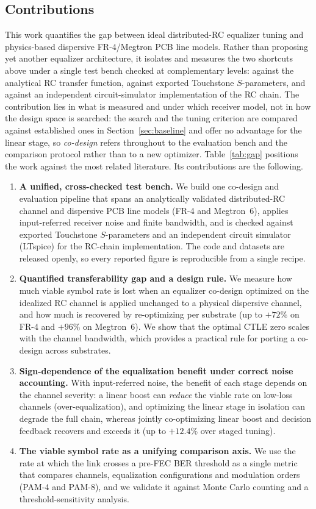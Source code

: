 \documentclass[twocolumn]{USG}
\begin{document}
\subsection{Contributions}
This work quantifies the gap between ideal distributed-RC equalizer tuning and
physics-based dispersive FR-4/Megtron PCB line models. Rather than proposing yet
another equalizer architecture, it isolates and measures the two shortcuts
above under a single test bench checked at complementary levels: against the
analytical RC transfer function, against exported Touchstone
$S$-parameters, and against an independent circuit-simulator implementation
of the RC chain. The contribution lies in what is measured and under which
receiver model, not in how the design space is searched: the search and the
tuning criterion are compared against established ones in
Section~\ref{sec:baseline} and offer no advantage for the linear stage, so
\emph{co-design} refers throughout to the evaluation bench and the comparison
protocol rather than to a new optimizer. Table~\ref{tab:gap} positions the work
against the most related literature. Its contributions are the following.

\begin{enumerate}
\item \textbf{A unified, cross-checked test bench.} We build one co-design
and evaluation pipeline that spans an analytically validated
distributed-RC channel and dispersive PCB line models (FR-4 and Megtron~6),
applies input-referred receiver noise and finite bandwidth, and is checked
against exported Touchstone $S$-parameters and an independent circuit
simulator (LTspice) for the RC-chain implementation. The code and datasets
are released openly, so every reported figure is reproducible from a single
recipe.
\item \textbf{Quantified transferability gap and a design rule.} We measure
how much viable symbol rate is lost when an equalizer co-design optimized on
the idealized RC channel is applied unchanged to a physical dispersive
channel, and how much is recovered by re-optimizing per substrate (up to
$+72\%$ on FR-4 and $+96\%$ on Megtron~6). We show that the optimal CTLE
zero scales with the channel bandwidth, which provides a practical rule for
porting a co-design across substrates.
\item \textbf{Sign-dependence of the equalization benefit under correct
noise accounting.} With input-referred noise, the benefit of each stage
depends on the channel severity: a linear boost can \emph{reduce} the viable
rate on low-loss channels (over-equalization), and optimizing the linear
stage in isolation can degrade the full chain, whereas jointly
co-optimizing linear boost and decision feedback recovers and exceeds it
(up to $+12.4\%$ over staged tuning).
\item \textbf{The viable symbol rate as a unifying comparison axis.} We use
the rate at which the link crosses a pre-FEC BER threshold as a single
metric that compares channels, equalization configurations and modulation
orders (PAM-4 and PAM-8), and we validate it against Monte Carlo counting
and a threshold-sensitivity analysis.
\end{enumerate}
\end{document}
